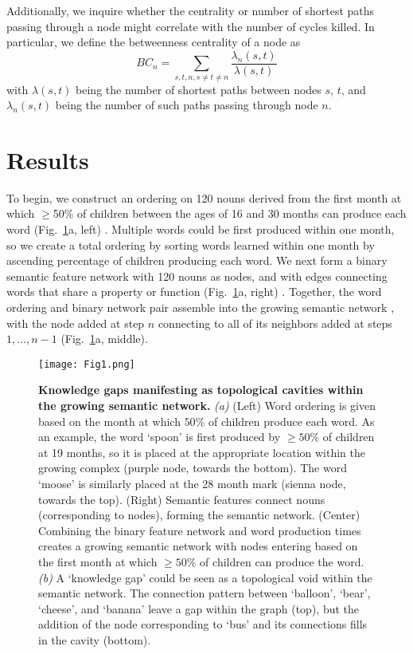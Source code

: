 \documentclass{article}
\begin{document}
Additionally, we inquire whether the centrality or number of shortest paths passing through a node might correlate with the number of cycles killed. In particular, we define the betweenness centrality \cite{kintali2008betweenness} of a node as
\begin{equation}
BC_n = \sum_{s,t,n, s\neq t\neq n} \frac{\lambda_{n}(s,t)}{\lambda(s,t)}
\end{equation}
with $\lambda(s,t)$ being the number of shortest paths between nodes $s$, $t$, and $\lambda_n(s,t)$ being the number of such paths passing through node $n$.



\section*{Results}

To begin, we construct an ordering on 120 nouns derived from the first month at which $\geq$50\% of children between the ages of 16 and 30 months can produce each word (Fig.~\ref{fig:1}a, left) \cite{frank2016wordbank}. Multiple words could be first produced within one month, so we create a total ordering by sorting words learned within one month by ascending percentage of children producing each word. We next form a binary semantic feature network with 120 nouns as nodes, and with edges connecting words that share a property or function (Fig.~\ref{fig:1}a, right) \cite{mcrae2005semantic}. Together, the word ordering and binary network pair assemble into the growing semantic network \cite{hills2009longitudinal}, with the node added at step $n$ connecting to all of its neighbors added at steps $1,\dots, n-1$ (Fig.~\ref{fig:1}a, middle).


\begin{figure}[h]
	\centering
	\texttt{[image: Fig1.png]}
	\caption{\textbf{Knowledge gaps manifesting as topological cavities within the growing semantic network.} \emph{(a)} (Left) Word ordering is given based on the month at which $50\%$ of children produce each word. As an example, the word `spoon' is first produced by $\geq50\%$ of children at 19 months, so it is placed at the appropriate location within the growing complex (purple node, towards the bottom). The word `moose' is similarly placed at the 28 month mark (sienna node, towards the top). (Right) Semantic features connect nouns (corresponding to nodes), forming the semantic network. (Center) Combining the binary feature network and word production times creates a growing semantic network with nodes entering based on the first month at which $\geq 50\%$ of children can produce the word. \emph{(b)} A `knowledge gap' could be seen as a topological void within the semantic network. The connection pattern between `balloon', `bear', `cheese', and `banana' leave a gap within the graph (top), but the addition of the node corresponding to `bus' and its connections fills in the cavity (bottom).}
	\label{fig:1}
\end{figure}
\end{document}
